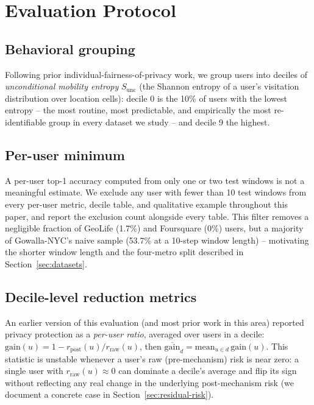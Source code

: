\section{Evaluation Protocol}
\label{sec:evaluation-protocol}


\subsection{Behavioral grouping}
Following prior individual-fairness-of-privacy work, we group users
into deciles of \emph{unconditional mobility entropy} $S_{\mathrm{unc}}$
(the Shannon entropy of a user's visitation distribution over
location cells): decile 0 is the 10\% of users with the lowest
entropy -- the most routine, most predictable, and empirically the
most re-identifiable group in every dataset we study -- and decile 9
the highest.

\subsection{Per-user minimum}
A per-user top-1 accuracy computed from only one or two test windows is
not a meaningful estimate. We exclude any user with fewer than 10 test
windows from every per-user metric, decile table, and qualitative
example throughout this paper, and report the exclusion count
alongside every table. This filter removes a negligible fraction of
GeoLife (1.7\%) and Foursquare (0\%) users, but a majority of
Gowalla-NYC's naive sample (53.7\% at a 10-step window length) --
motivating the shorter window length and the four-metro split described
in Section~\ref{sec:datasets}.

\subsection{Decile-level reduction metrics}
\label{sec:decile-reduction-metrics}
An earlier version of this evaluation (and most prior work in this
area) reported privacy protection as a \emph{per-user ratio}, averaged
over users in a decile: $\mathrm{gain}(u) = 1 - r_{\mathrm{post}}(u) /
r_{\mathrm{raw}}(u)$, then $\overline{\mathrm{gain}}_d =
\mathrm{mean}_{u \in d}\, \mathrm{gain}(u)$. This statistic is unstable
whenever a user's raw (pre-mechanism) risk is near zero: a single user
with $r_{\mathrm{raw}}(u) \approx 0$ can dominate a decile's average and
flip its sign without reflecting any real change in the underlying
post-mechanism risk (we document a concrete case in
Section~\ref{sec:residual-risk}).

